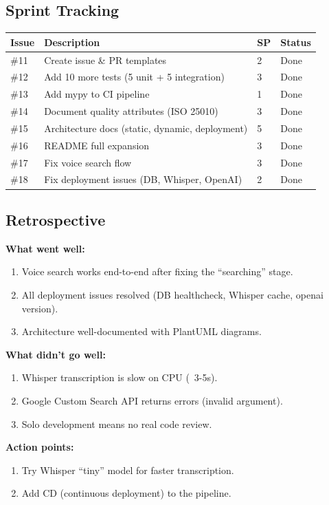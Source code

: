 \documentclass[11pt, a4paper]{article}
\begin{document}
\subsection*{Sprint Tracking}

\begin{tabularx}{\textwidth}{lXll}
\toprule
\textbf{Issue} & \textbf{Description} & \textbf{SP} & \textbf{Status} \\
\midrule
\#11 & Create issue \& PR templates & 2 & Done \\
\#12 & Add 10 more tests (5 unit + 5 integration) & 3 & Done \\
\#13 & Add mypy to CI pipeline & 1 & Done \\
\#14 & Document quality attributes (ISO 25010) & 3 & Done \\
\#15 & Architecture docs (static, dynamic, deployment) & 5 & Done \\
\#16 & README full expansion & 3 & Done \\
\#17 & Fix voice search flow & 3 & Done \\
\#18 & Fix deployment issues (DB, Whisper, OpenAI) & 2 & Done \\
\bottomrule
\end{tabularx}

\subsection*{Retrospective}

\textbf{What went well:}
\begin{enumerate}
    \item Voice search works end-to-end after fixing the ``searching'' stage.
    \item All deployment issues resolved (DB healthcheck, Whisper cache, openai version).
    \item Architecture well-documented with PlantUML diagrams.
\end{enumerate}

\textbf{What didn't go well:}
\begin{enumerate}
    \item Whisper transcription is slow on CPU (~3-5s).
    \item Google Custom Search API returns errors (invalid argument).
    \item Solo development means no real code review.
\end{enumerate}

\textbf{Action points:}
\begin{enumerate}
    \item Try Whisper ``tiny'' model for faster transcription.
    \item Add CD (continuous deployment) to the pipeline.
\end{enumerate}
\end{document}
